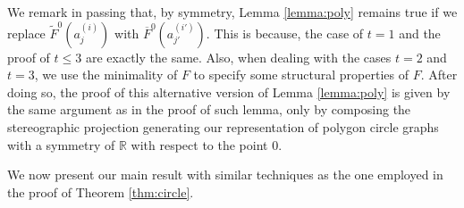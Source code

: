 \documentclass[12pt]{article}
\theoremstyle{definition}
\begin{document}
     We remark in passing that, by symmetry,
     Lemma \ref{lemma:poly} remains 
     true if we
     replace $\widetilde{F}^{0}\left(a_{j}^{\left(i\right)}\right)$ 
     with $\overline{F}^{0}\left(a_{j'}^{\left(i'\right)}\right)$.
     This is because, the case of $t = 1$
     and the proof of $t \leq 3$ are exactly
     the same. Also, when 
     dealing with the cases $t = 2$ 
     and $t = 3$, we use the minimality
     of $F$ to specify some structural
     properties of $F$. After doing so,
     the proof of this alternative version of
     Lemma \ref{lemma:poly} is given by 
     the same argument as in the proof
     of such lemma, only by composing
     the stereographic projection
     generating our representation
     of polygon circle graphs with
     a symmetry of $\mathbb{R}$ with
     respect to the point 0.

     We now present our main result
     with similar techniques as the one
     employed in the proof of
     Theorem \ref{thm:circle}.
\end{document}
